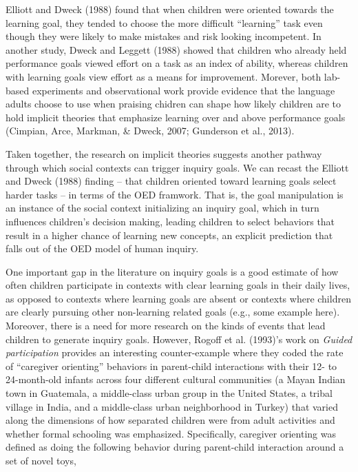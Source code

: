 \documentclass[english,man]{apa6}
\theoremstyle{definition}
\theoremstyle{definition}
\theoremstyle{definition}
\theoremstyle{remark}
\begin{document}
Elliott and Dweck (1988) found that when children were oriented towards
the learning goal, they tended to choose the more difficult
\enquote{learning} task even though they were likely to make mistakes
and risk looking incompetent. In another study, Dweck and Leggett (1988)
showed that children who already held performance goals viewed effort on
a task as an index of ability, whereas children with learning goals view
effort as a means for improvement. Morever, both lab-based experiments
and observational work provide evidence that the language adults choose
to use when praising chidren can shape how likely children are to hold
implicit theories that emphasize learning over and above performance
goals (Cimpian, Arce, Markman, \& Dweck, 2007; Gunderson et al., 2013).

Taken together, the research on implicit theories suggests another
pathway through which social contexts can trigger inquiry goals. We can
recast the Elliott and Dweck (1988) finding -- that children oriented
toward learning goals select harder tasks -- in terms of the OED
framwork. That is, the goal manipulation is an instance of the social
context initializing an inquiry goal, which in turn influences
children's decision making, leading children to select behaviors that
result in a higher chance of learning new concepts, an explicit
prediction that falls out of the OED model of human inquiry.

One important gap in the literature on inquiry goals is a good estimate
of how often children participate in contexts with clear learning goals
in their daily lives, as opposed to contexts where learning goals are
absent or contexts where children are clearly pursuing other
non-learning related goals (e.g., some example here). Moreover, there is
a need for more research on the kinds of events that lead children to
generate inquiry goals. However, Rogoff et al. (1993)'s work on
\emph{Guided participation} provides an interesting counter-example
where they coded the rate of \enquote{caregiver orienting} behaviors in
parent-child interactions with their 12- to 24-month-old infants across
four different cultural communities (a Mayan Indian town in Guatemala, a
middle-class urban group in the United States, a tribal village in
India, and a middle-class urban neighborhood in Turkey) that varied
along the dimensions of how separated children were from adult
activities and whether formal schooling was emphasized. Specifically,
caregiver orienting was defined as doing the following behavior during
parent-child interaction around a set of novel toys,
\end{document}
